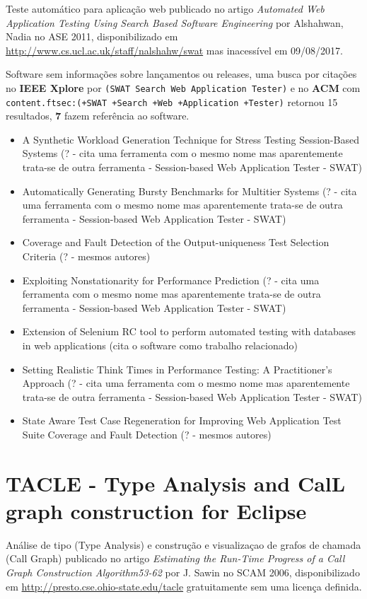 Teste automático para aplicação web
publicado no artigo {\it Automated Web Application Testing Using Search Based Software Engineering}
por Alshahwan, Nadia
no ASE 2011,
disponibilizado em \url{http://www.cs.ucl.ac.uk/staff/nalshahw/swat}
mas inacessível em 09/08/2017.

Software sem informações sobre lançamentos ou releases,
uma busca por citações no {\bf IEEE Xplore} por
\texttt{(SWAT Search Web Application Tester)}
e no {\bf ACM} com
\texttt{content.ftsec:(+SWAT +Search +Web +Application +Tester)}
retornou
15 resultados,
{\bf 7} fazem referência ao software.

\begin{itemize}
\item A Synthetic Workload Generation Technique for Stress Testing Session-Based Systems (? - cita uma ferramenta com o mesmo nome mas aparentemente trata-se de outra ferramenta - Session-based Web Application Tester - SWAT)
\item Automatically Generating Bursty Benchmarks for Multitier Systems (? - cita uma ferramenta com o mesmo nome mas aparentemente trata-se de outra ferramenta - Session-based Web Application Tester - SWAT)
\item Coverage and Fault Detection of the Output-uniqueness Test Selection Criteria (? - mesmos autores)
\item Exploiting Nonstationarity for Performance Prediction (? - cita uma ferramenta com o mesmo nome mas aparentemente trata-se de outra ferramenta - Session-based Web Application Tester - SWAT)
\item Extension of Selenium RC tool to perform automated testing with databases in web applications (cita o software como trabalho relacionado)
\item Setting Realistic Think Times in Performance Testing: A Practitioner's Approach (? - cita uma ferramenta com o mesmo nome mas aparentemente trata-se de outra ferramenta - Session-based Web Application Tester - SWAT)
\item State Aware Test Case Regeneration for Improving Web Application Test Suite Coverage and Fault Detection (? - mesmos autores)
\end{itemize}

\section{TACLE - Type Analysis and CalL graph construction for Eclipse}

Análise de tipo (Type Analysis) e construção e visualizaçao de grafos de chamada (Call Graph)
publicado no artigo {\it Estimating the Run-Time Progress of a Call Graph Construction Algorithm53-62}
por J. Sawin
no SCAM 2006,
disponibilizado em \url{http://presto.cse.ohio-state.edu/tacle}
gratuitamente
sem uma licença definida.

